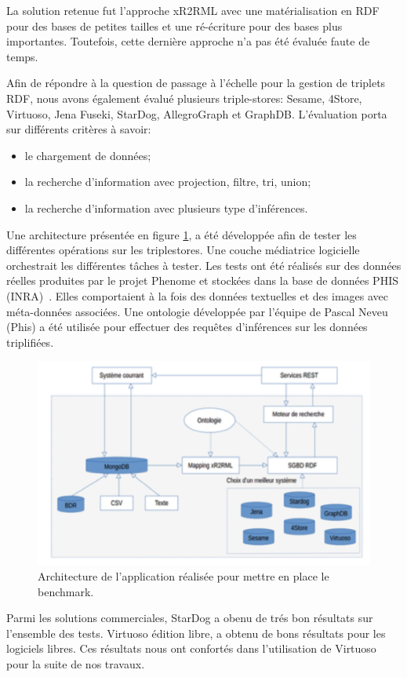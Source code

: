 La solution retenue fut l'approche xR2RML avec une matérialisation en RDF pour des bases de petites tailles et une ré-écriture pour des bases plus importantes. Toutefois, cette dernière approche n'a pas été évaluée faute de temps. 

Afin de répondre à la question de passage à l'échelle pour la gestion de triplets RDF, nous avons également évalué plusieurs triple-stores: Sesame, 4Store, Virtuoso, Jena Fuseki, StarDog, AllegroGraph et GraphDB.  L'évaluation porta sur différents critères à savoir:
\begin{itemize}
\item le chargement de données; 
\item la recherche d'information avec projection, filtre, tri, union;
\item la recherche d'information avec plusieurs type d'inférences.\\
\end{itemize}


Une architecture présentée en figure \ref{mongo}, a été développée afin de tester les différentes opérations sur les triplestores. Une couche médiatrice logicielle orchestrait les différentes tâches à tester. Les tests ont été réalisés sur des données réelles produites par le projet Phenome et stockées dans la base de données PHIS (INRA)~\cite{neveu2018}. Elles comportaient à la fois des données textuelles et des images avec méta-données associées.  Une ontologie développée par l'équipe de Pascal Neveu (Phis) a été utilisée pour effectuer des requêtes d'inférences sur les données triplifiées.


\begin{figure}[!ht]
\begin{center}
	\includegraphics[width=1\textwidth]{Figures/MongoRDF.png}
\end{center}
\caption{\label{mongo} Architecture de l'application réalisée pour mettre en place le benchmark.}
\end{figure}
Parmi les solutions commerciales, StarDog a obenu de trés bon résultats sur l'ensemble des tests. Virtuoso édition libre, a obtenu de bons résultats pour les logiciels libres. Ces résultats nous ont confortés dans l'utilisation de Virtuoso pour la suite de nos travaux.

